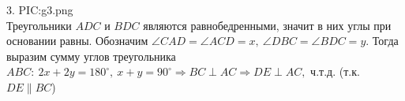 3. {{PIC:g3.png}}\\
Треугольники $ADC$ и $BDC$ являются равнобедренными, значит в них углы при основании равны. Обозначим $\angle CAD=\angle ACD=x,\ \angle DBC=\angle BDC=y.$ Тогда выразим сумму углов треугольника $ABC:\ 2x+2y=180^\circ,\ x+y=90^\circ\Rightarrow BC \perp AC\Rightarrow DE\perp AC,$ ч.т.д. (т.к. $DE\parallel BC$)\\
